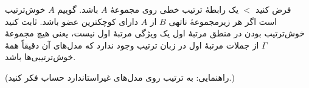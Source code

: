 فرض کنید $<$ یک رابطهٔ ترتیب خطی روی مجموعهٔ $A$ باشد. گوییم $A$ خوش‌ترتیب است اگر هر زیرمجموعهٔ ناتهی $B$ از $A$ دارای کوچکترین عضو باشد. ثابت کنید خوش‌ترتیب بودن در منطق مرتبهٔ اول یک ویژگی مرتبهٔ اول نیست، یعنی هیچ مجموعهٔ $\Gamma$ از جملات مرتبهٔ اول در زبان ترتیب وجود ندارد که مدل‌های آن دقیقاً همهٔ خوش‌ترتیبی‌ها باشد.

(راهنمایی: به ترتیب روی مدل‌های غیراستاندارد حساب فکر کنید.)